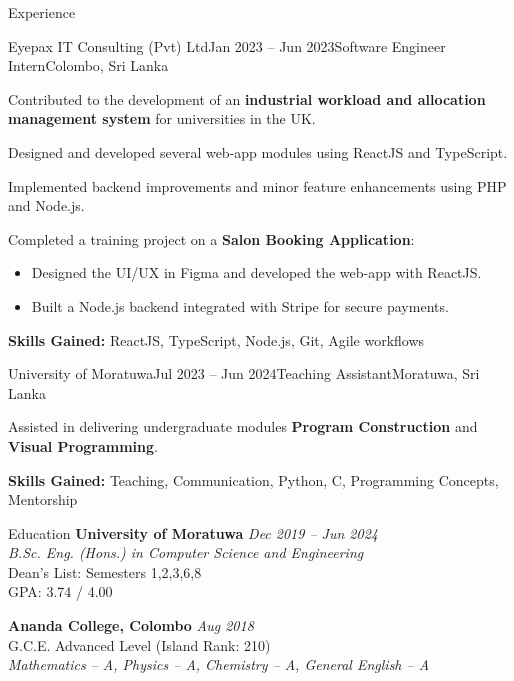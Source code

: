 \documentclass[11pt]{resume}
\begin{document}
\begin{rSection}{Experience}
\begin{rSubsection}{Eyepax IT Consulting (Pvt) Ltd}{Jan 2023 – Jun 2023}{Software Engineer Intern}{Colombo, Sri Lanka}
\item Contributed to the development of an \textbf{industrial workload and allocation management system} for universities in the UK.
\item Designed and developed several web-app modules using ReactJS and TypeScript.
\item Implemented backend improvements and minor feature enhancements using PHP and Node.js.
\item Completed a training project on a \textbf{Salon Booking Application}:
    \begin{itemize}
        \item Designed the UI/UX in Figma and developed the web-app with ReactJS.
        \item Built a Node.js backend integrated with Stripe for secure payments.
    \end{itemize}
\item \textbf{Skills Gained:} ReactJS, TypeScript, Node.js, Git, Agile workflows
\end{rSubsection}

\begin{rSubsection}{University of Moratuwa}{Jul 2023 – Jun 2024}{Teaching Assistant}{Moratuwa, Sri Lanka}
\item Assisted in delivering undergraduate modules \textbf{Program Construction} and \textbf{Visual Programming}.
\item \textbf{Skills Gained:} Teaching, Communication, Python, C, Programming Concepts, Mentorship
\end{rSubsection}

\end{rSection}


\begin{rSection}{Education}
\textbf{University of Moratuwa} \hfill \textit{Dec 2019 – Jun 2024} \\
\textit{B.Sc. Eng. (Hons.) in Computer Science and Engineering} \\
Dean’s List: Semesters 1,2,3,6,8 \\
GPA: 3.74 / 4.00

\medskip
\textbf{Ananda College, Colombo} \hfill \textit{Aug 2018} \\
G.C.E. Advanced Level (Island Rank: 210) \\
\textit{Mathematics – A, Physics – A, Chemistry – A, General English – A}
\end{rSection}
\end{document}

